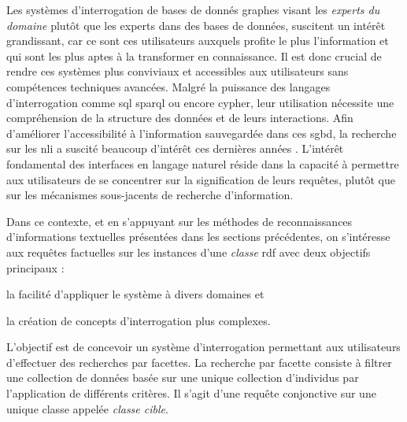 Les systèmes d'interrogation de bases de donnés graphes visant les \emph{experts du domaine} plutôt que les experts dans des bases de données, suscitent un intérêt grandissant, car ce sont ces utilisateurs auxquels profite le plus l'information et qui sont les plus aptes à la transformer en connaissance.
Il est donc crucial de rendre ces systèmes plus conviviaux et accessibles aux utilisateurs sans compétences techniques avancées.
Malgré la puissance des langages d'interrogation comme \gls{sql} \gls{sparql} ou encore \gls{cypher}, leur utilisation nécessite une compréhension de la structure des données et de leurs interactions.
Afin d'améliorer l'accessibilité à l'information sauvegardée dans ces \gls{sgbd}, la recherche sur les \gls{nli} a suscité beaucoup d'intérêt ces dernières années \cite{zhengQuestionAnsweringKnowledge2018,wangCrossdomainNaturalLanguage2019,xuMirrorNaturalLanguage2023,vargas-solarTranslatingDataScience2023,vargas-solarConversationalDataExploration2023}.
L'intérêt fondamental des interfaces en langage naturel réside dans la capacité à permettre aux utilisateurs de se concentrer sur la signification de leurs requêtes, plutôt que sur les mécanismes sous-jacents de recherche d'information.

Dans ce contexte, et en s'appuyant sur les méthodes de reconnaissances d'informations textuelles présentées dans les sections précédentes, on s'intéresse aux requêtes factuelles sur les instances d'une \emph{classe} \gls{rdf} avec deux objectifs principaux :
\begin{enumerate*}[label=(\roman*)]
    \item la facilité d'appliquer le système à divers domaines et
    \item la création de concepts d'interrogation plus complexes.
\end{enumerate*}
L'objectif est de concevoir un système d'interrogation permettant aux utilisateurs d'effectuer des recherches par facettes.
La recherche par facette consiste à filtrer une collection de données basée sur une unique collection d'individus par l'application de différents critères.
Il s'agit d'une requête conjonctive sur une unique classe appelée \emph{classe cible}.

